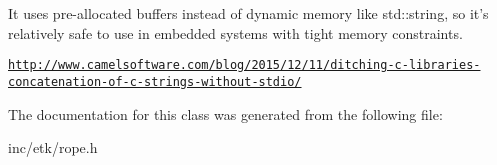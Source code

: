 It uses pre-\/allocated buffers instead of dynamic memory like std\-::string, so it's relatively safe to use in embedded systems with tight memory constraints.

\href{http://www.camelsoftware.com/blog/2015/12/11/ditching-c-libraries-concatenation-of-c-strings-without-stdio/}{\tt http\-://www.\-camelsoftware.\-com/blog/2015/12/11/ditching-\/c-\/libraries-\/concatenation-\/of-\/c-\/strings-\/without-\/stdio/} 

The documentation for this class was generated from the following file\-:\begin{DoxyCompactItemize}
\item 
inc/etk/rope.\-h\end{DoxyCompactItemize}
